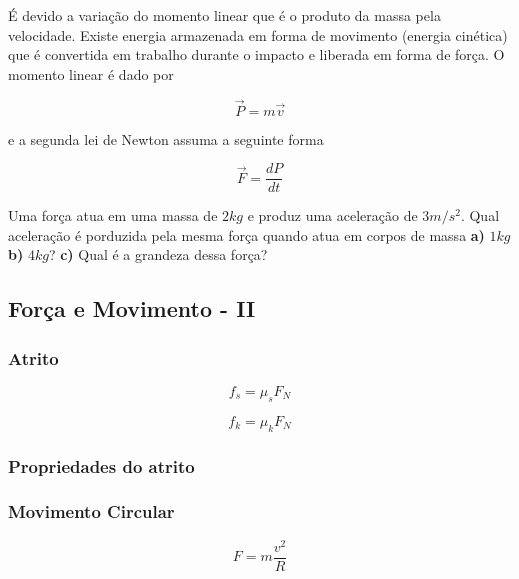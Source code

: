 É devido a variação do momento linear que é o produto da massa pela velocidade. Existe energia armazenada em forma de movimento (energia cinética) que é convertida em trabalho durante o impacto e liberada em forma de força. O momento linear é dado por 

\begin{equation}\label{14.9}
    \vec{P}=m\vec{v}
\end{equation}

e a segunda lei de Newton assuma a seguinte forma

\begin{equation}\label{14.10}
    \vec{F}=\dfrac{dP}{dt}
\end{equation}

\begin{exe}
Uma força atua em uma massa de $2kg$ e produz uma aceleração de $3m/s^2$. Qual aceleração é porduzida pela mesma força quando atua em corpos de massa \textbf{a)} $1kg$ \textbf{b)} $4kg$? \textbf{c)} Qual é a grandeza dessa força?
\end{exe}

\subsection{Força e Movimento - II}

\subsubsection{Atrito}

\begin{equation}\label{14.11}
    f_s=\mu_sF_N
\end{equation}

\begin{equation}\label{14.12}
    f_k=\mu_kF_N
\end{equation}

\subsubsection{Propriedades do atrito}
\subsubsection{Movimento Circular}

\begin{equation}\label{14.13}
    F=m\dfrac{v^2}{R}
\end{equation}



